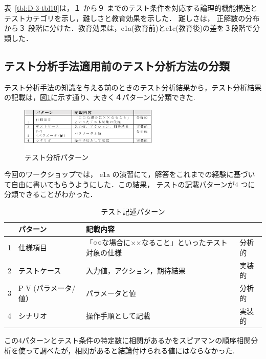 表~\ref{tbl:D-3-tbl10}は，１ から９ までのテスト条件を対応する論理的機能構造とテストカテゴリを示し，難しさと教育効果を示した． 難しさは， 正解数の分布から３ 段階に分けた．教育効果は，e1a(教育前)とe1c(教育後)の差を３段階で分類した．


\subsection{テスト分析手法適用前のテスト分析方法の分類}
テスト分析手法の知識を与える前のときのテスト分析結果から，テスト分析結果の記載は，図\ref{fig:D-3-Fig14}に示す通り、大きく４パターンに分類できた.
\begin{figure}[h]
  \begin{center}
  \includegraphics[width=7cm]{./image/D-3-Fig14.png}
  \caption{テスト分析パターン}
  \label{fig:D-3-Fig14}
  \end{center}
\end{figure}

今回のワークショップでは， e1a の演習にて，解答をこれまでの経験に基づいて自由に書いてもらうようにした．この結果， テストの記載パターンが4 つに分類できることがわかった．
\begin{table}[htbp]
  \centering
  \caption{テスト記述パターン}
    \begin{tabular}{|c|p{8.57em}|p{10.215em}|p{3.855em}|}
    \hline
          & \textbf{パターン} & \textbf{記載内容} & \multicolumn{1}{c|}{} \bigstrut\\
    \hline
    1     & 仕様項目  & 「○○な場合に××なること」といったテスト対象の仕様 & 分析的 \bigstrut\\
    \hline
    2     & テストケース & 入力値，アクション，期待結果 & 実装的 \bigstrut\\
    \hline
    3     & P-V
(パラメータ/値） & パラメータと値 & 分析的 \bigstrut[t]\\
    4     & シナリオ  & 操作手順として記載 & 実装的 \bigstrut[b]\\
    \hline
    \end{tabular}%
  \label{tbl:D-3-tbl11}%
\end{table}%

この4パターンとテスト条件の特定数に相関があるかをスピアマンの順序相関分析を使って調べたが，相関があると結論付けられる値にはならなかった.

